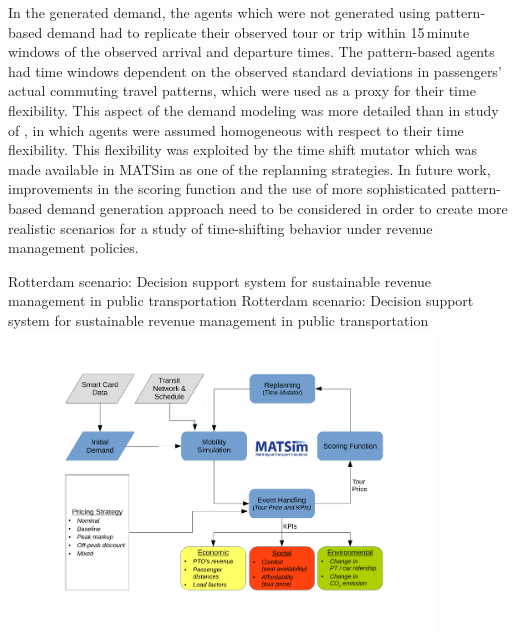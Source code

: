 In the generated demand, the agents which were not generated using pattern-based demand had to replicate their observed tour or trip within 15\,minute windows of the observed arrival and departure times. The pattern-based agents had time windows dependent on the observed standard deviations in passengers' actual commuting travel patterns, which were used as a proxy for their time flexibility. This aspect of the demand modeling was more detailed than in study of \citet[][]{LovricEtAl_DSS_2013}, in which agents were assumed homogeneous with respect to their time flexibility. This flexibility was exploited by the time shift mutator which was made available in MATSim as one of the replanning strategies. In future work, improvements in the scoring function and the use of more sophisticated pattern-based demand generation approach need to be considered in order to create more realistic scenarios for a study of time-shifting behavior under revenue management policies.

\createfigure%
{Rotterdam scenario: Decision support system for sustainable revenue management in public transportation}%
{Rotterdam scenario: Decision support system for sustainable revenue management in public transportation}%
{\label{fig:rotterdam}}%
{\includegraphics[width=0.85\textwidth, angle=0]{./using/figures/rotterdam}}%
{}


